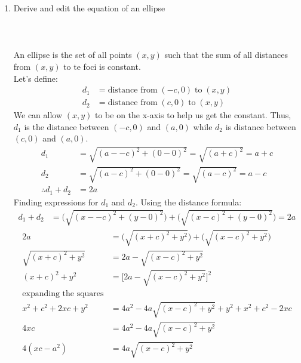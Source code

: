 \documentclass[12pt, a4paper]{article}
\begin{document}
\begin{enumerate}
		
		
		\pagebreak
		\item Derive and edit the equation of an ellipse
		\\
		\\
		\\
		\\
		An ellipse is the set of all points $(x, y)$ such that the sum of all distances from $(x, y)$ to te foci is constant.\\
		Let's define:
		\begin{align*}
			d_1 &= \text{distance from} \; (-c, 0) \; \text{to} \; (x, y)\\
			d_2 &= \text{distance from} \; (c, 0) \; \text{to} \; (x, y)
		\end{align*}
		We can allow $(x, y)$ to be on the x-axis to help us get the constant. Thus, $d_1$ is the distance between $(-c, 0)$ and $(a, 0)$ while $d_2$ is distance between $(c, 0)$ and $(a, 0)$.
		\begin{align*}
			d_1 &= \sqrt{(a - -c)^2 + (0 - 0)^2} = \sqrt{(a + c)^2} = a + c\\
			d_2 &= \sqrt{(a - c)^2 + (0-0)^2} = \sqrt{(a - c)^2} = a - c\\
			\therefore d_1 + d_2 &= 2a
		\end{align*}
		Finding expressions for $d_1$ and $d_2$. Using the distance formula:
		\begin{align*}
			d_1 + d_2 &= \Big( \sqrt{(x - -c)^2 + (y - 0)^2} \Big) + \Big( \sqrt{(x - c)^2 + (y-0)^2} \Big) = 2a
		\end{align*}
		\begin{align*}
			2a &= \Big( \sqrt{(x +c)^2 + y^2} \Big) + \Big( \sqrt{(x - c)^2 + y^2} \Big) \\
			\sqrt{(x +c)^2 + y^2} &= 2a - \sqrt{(x - c)^2 + y^2}\\
			(x + c)^2 + y^2 &= \Big[2a -  \sqrt{(x - c)^2 + y^2} \Big]^2\\
			\text{expanding the squares}\\
			x^2 + c^2 + 2xc + y^2 &= 4a^2 - 4a\sqrt{(x - c)^2 + y^2}  + y^2 + x^2 + c^2 - 2xc\\
			4xc &= 4a^2 - 4a\sqrt{(x - c)^2 + y^2}\\
			4(xc - a^2) &= 4a\sqrt{(x - c)^2 + y^2}\\

\end{align*}
\end{enumerate}
\end{document}
